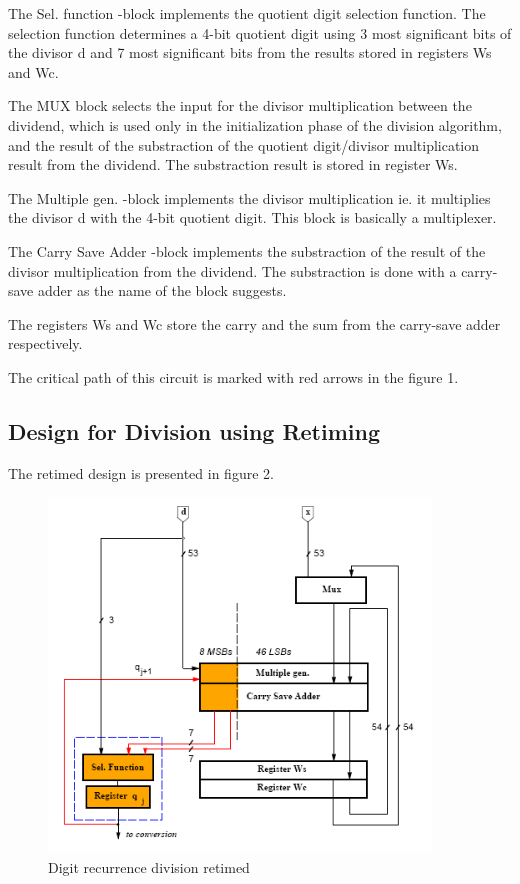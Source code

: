 \documentclass[11pt,a4paper]{article}
\begin{document}
\FloatBarrier

The Sel. function -block implements the quotient digit selection function. The selection function determines a 4-bit quotient digit using 3 most significant bits of the divisor d and 7 most significant bits from the results stored in registers Ws and Wc.

The MUX block selects the input for the divisor multiplication between the dividend, which is used only in the initialization phase of the division algorithm, and the result of the substraction of the quotient digit/divisor multiplication result from the dividend. The substraction result is stored in register Ws.

The Multiple gen. -block implements the divisor multiplication ie. it multiplies the divisor d with the 4-bit quotient digit. This block is basically a multiplexer.

The Carry Save Adder -block implements the substraction of the result of the divisor multiplication from the dividend. The substraction is done with a carry-save adder as the name of the block suggests.

The registers Ws and Wc store the carry and the sum from the carry-save adder respectively.

The critical path of this circuit is marked with red arrows in the figure 1.

\subsection{Design for Division using Retiming}
The retimed design is presented in figure 2.

\begin{figure}
	\centering
		\includegraphics[width=4in]{./retiming.PNG}
	\caption{Digit recurrence division retimed}
	\label{fig:retiming}
\end{figure}
\end{document}

